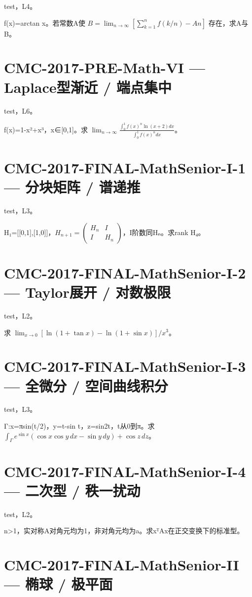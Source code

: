 \documentclass[UTF8]{ctexart}
\begin{document}
test，L4。

f(x)=arctan x。若常数A使 $B=\lim_{n\to\infty}[\sum_{k=1}^nf(k/n)-An]$ 存在，求A与B。

\section*{CMC-2017-PRE-Math-VI — Laplace型渐近 / 端点集中}

test，L6。

f(x)=1-x²+x³，x∈[0,1]。求 $\lim_{n\to\infty}\frac{\int_0^1f(x)^n\ln(x+2)dx}{\int_0^1f(x)^ndx}$。

\section*{CMC-2017-FINAL-MathSenior-I-1 — 分块矩阵 / 谱递推}

test，L3。

H₁=[[0,1],[1,0]]，$H_{n+1}=\begin{pmatrix}H_n&I\\I&H_n\end{pmatrix}$，I阶数同Hₙ。求rank H₄。

\section*{CMC-2017-FINAL-MathSenior-I-2 — Taylor展开 / 对数极限}

test，L2。

求 $\lim_{x\to0}[\ln(1+\tan x)-\ln(1+\sin x)]/x^3$。

\section*{CMC-2017-FINAL-MathSenior-I-3 — 全微分 / 空间曲线积分}

test，L3。

Γ:x=πsin(t/2)，y=t-sin t，z=sin2t，t从0到π。求 $\int_\Gamma e^{\sin x}(\cos x\cos y\,dx-\sin y\,dy)+\cos z\,dz$。

\section*{CMC-2017-FINAL-MathSenior-I-4 — 二次型 / 秩一扰动}

test，L2。

n>1，实对称A对角元均为1，非对角元均为a。求xᵀAx在正交变换下的标准型。

\section*{CMC-2017-FINAL-MathSenior-II — 椭球 / 极平面}
\end{document}
